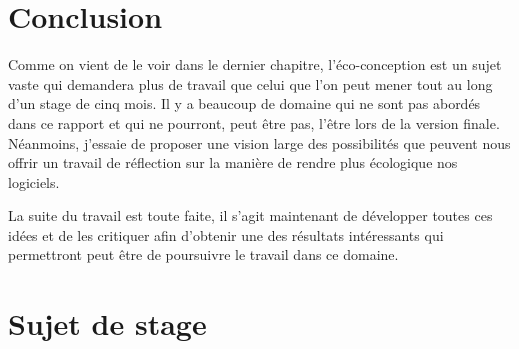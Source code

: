 \documentclass[a4paper, 11pt]{report}
\begin{document}
\chapter{Conclusion}
Comme on vient de le voir dans le dernier chapitre, l'éco-conception est un sujet vaste qui demandera plus de travail que celui que l'on peut mener tout au long d'un stage de cinq mois. Il y a beaucoup de domaine qui ne sont pas abordés dans ce rapport et qui ne pourront, peut être pas, l'être lors de la version finale. Néanmoins, j'essaie de proposer une vision large des possibilités que peuvent nous offrir un travail de réflection sur la manière de rendre plus écologique nos logiciels.

La suite du travail est toute faite, il s'agit maintenant de développer toutes ces idées et de les critiquer afin d'obtenir une des résultats intéressants qui permettront peut être de poursuivre le travail dans ce domaine.

\listoffigures{}
\listoftables{}
\appendix

\chapter{Sujet de stage}

\end{document}
